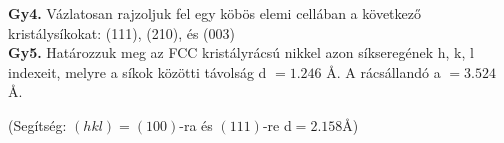 \documentclass[12pt]{article}
\begin{document}
\textbf{Gy4.} Vázlatosan rajzoljuk fel egy köbös elemi cellában a következő kristálysíkokat: (111), (210),
és (003)
\\

\textbf{Gy5.} Határozzuk meg az FCC kristályrácsú nikkel azon síkseregének h, k, l indexeit, melyre a síkok közötti távolság d $= 1.246$ Å. A rácsállandó a $= 3.524$ Å.

(Segítség: $(hkl)=(100)$-ra és $(111)$-re d$=2.158$Å)
\end{document}

